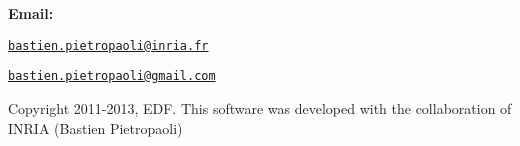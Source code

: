 {\bfseries Email:} \par
 \href{mailto:bastien.pietropaoli@inria.fr}{\tt bastien.pietropaoli@inria.fr} \par
 \href{mailto:bastien.pietropaoli@gmail.com}{\tt bastien.pietropaoli@gmail.com} \par


Copyright 2011-\/2013, EDF. This software was developed with the collaboration of INRIA (Bastien Pietropaoli) 